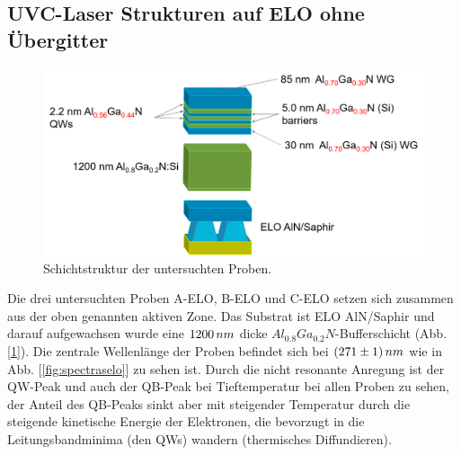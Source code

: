 \subsection{UVC-Laser Strukturen auf ELO ohne Übergitter}
%
\begin{figure}[h]
\includegraphics[width=\linewidth]{Bilder/TS4045/ts4045.png}
\caption{Schichtstruktur der untersuchten Proben.}
\label{fig:schichtenelo}
\end{figure}
\noindent 
\vspace{1cm}
%
Die drei untersuchten Proben A-ELO, B-ELO und C-ELO setzen sich zusammen aus der oben genannten aktiven Zone. Das Substrat ist ELO AlN/Saphir und darauf aufgewachsen wurde eine $1200 \thinspace nm$ dicke $ Al_{0.8}Ga_{0.2}N$-Bufferschicht (Abb. [\ref{fig:schichtenelo}]). Die zentrale Wellenlänge der Proben befindet sich bei $(271 \pm 1) \thinspace nm$ wie in Abb. [\ref{fig:spectraselo}] zu sehen ist. Durch die nicht resonante Anregung ist der QW-Peak und auch der QB-Peak bei Tieftemperatur bei allen Proben zu sehen, der Anteil des QB-Peaks sinkt aber mit steigender Temperatur durch die steigende kinetische Energie der Elektronen, die bevorzugt in die Leitungsbandminima (den QWs) wandern (thermisches Diffundieren).
%
